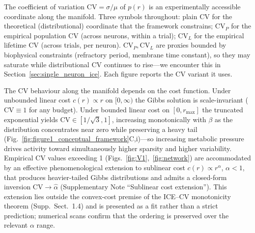 The coefficient of variation $\mathrm{CV}=\sigma/\mu$ of $p(r)$ is an experimentally accessible coordinate along the manifold.  Three symbols throughout: plain $\mathrm{CV}$ for the theoretical (distributional) coordinate that the framework constrains; $\mathrm{CV}_P$ for the empirical population CV (across neurons, within a trial); $\mathrm{CV}_L$ for the empirical lifetime CV (across trials, per neuron).  $\mathrm{CV}_P, \mathrm{CV}_L$ are proxies bounded by biophysical constraints (refractory period, membrane time constant), so they may saturate while distributional $\mathrm{CV}$ continues to rise---we encounter this in Section~\ref{sec:single_neuron_ice}.  Each figure reports the CV variant it uses.

The CV behaviour along the manifold depends on the cost function.  Under unbounded linear cost $c(r)\propto r$ on $[0,\infty)$ the Gibbs solution is scale-invariant ($\mathrm{CV}\equiv 1$ for any budget).  Under bounded linear cost on $[0,r_{\max}]$ the truncated exponential yields $\mathrm{CV}\in[1/\sqrt{3},1]$, increasing monotonically with $\beta$ as the distribution concentrates near zero while preserving a heavy tail (Fig.~\ref{fig:figure1_conceptual_framework}C,i)---so increasing metabolic pressure drives activity toward simultaneously higher sparsity and higher variability.  Empirical CV values exceeding 1 (Figs.~\ref{fig:V1},~\ref{fig:network}) are accommodated by an effective phenomenological extension to sublinear cost $c(r)\propto r^\alpha$, $\alpha<1$, that produces heavier-tailed Gibbs distributions and admits a closed-form inversion CV$\to\hat\alpha$ (Supplementary Note ``Sublinear cost extension'').  This extension lies outside the convex-cost premise of the ICE--CV monotonicity theorem (Supp.~Sect.~1.4) and is presented as a fit rather than a strict prediction; numerical scans confirm that the ordering is preserved over the relevant $\alpha$ range.

